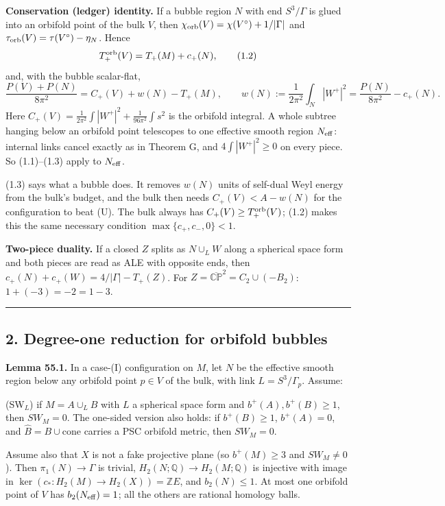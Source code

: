 \documentclass[
  10pt,
]{report}
\begin{document}
\textbf{Conservation (ledger) identity.} If a bubble region \(N\) with
end \(S^3/\Gamma\) is glued into an orbifold point of the bulk \(V\),
then \(\chi_{\rm orb}(V)=\chi(V^\circ)+1/|\Gamma|\) and
\(\tau_{\rm orb}(V)=\tau(V^\circ)-\eta_N\). Hence \[
T_+^{\rm orb}(V)=T_+(M)+c_+(N),\tag{1.2}
\] and, with the bubble scalar-flat, \[
\frac{P(V)+P(N)}{8\pi^2}=C_+(V)+w(N)-T_+(M),\qquad w(N):=\frac1{2\pi^2}\int_N|W^+|^2=\frac{P(N)}{8\pi^2}-c_+(N).\tag{1.3}
\] Here \(C_+(V)=\frac1{2\pi^2}\int|W^+|^2+\frac1{96\pi^2}\int s^2\) is
the orbifold integral. A whole subtree hanging below an orbifold point
telescopes to one effective smooth region \(N_{\rm eff}\): internal
links cancel exactly as in Theorem G, and \(4\int|W^+|^2\ge0\) on every
piece. So (1.1)--(1.3) apply to \(N_{\rm eff}\).

(1.3) says what a bubble does. It removes \(w(N)\) units of self-dual
Weyl energy from the bulk's budget, and the bulk then needs
\(C_+(V)<A-w(N)\) for the configuration to beat (U). The bulk always has
\(C_+(V)\ge T_+^{\rm orb}(V)\); (1.2) makes this the same necessary
condition \(\max\{c_+,c_-,0\}<1\).

\textbf{Two-piece duality.} If a closed \(Z\) splits as \(N\cup_LW\)
along a spherical space form and both pieces are read as ALE with
opposite ends, then \(c_+(N)+c_+(W)=4/|\Gamma|-T_+(Z)\). For
\(Z=\overline{\mathbb{CP}}^2=C_2\cup(-B_2)\): \(1+(-3)=-2=1-3\).

\begin{center}\rule{0.5\linewidth}{0.5pt}\end{center}

\hypertarget{degree-one-reduction-for-orbifold-bubbles}{%
\subsection{2. Degree-one reduction for orbifold
bubbles}\label{degree-one-reduction-for-orbifold-bubbles}}

\textbf{Lemma 55.1.} In a case-(I) configuration on \(M\), let \(N\) be
the effective smooth region below any orbifold point \(p\in V\) of the
bulk, with link \(L=S^3/\Gamma_p\). Assume:

(SW\(_L\)) if \(M=A\cup_LB\) with \(L\) a spherical space form and
\(b^+(A),b^+(B)\ge1\), then \(SW_M=0\). The one-sided version also
holds: if \(b^+(B)\ge1\), \(b^+(A)=0\), and
\(\widehat B=B\cup\mathrm{cone}\) carries a PSC orbifold metric, then
\(SW_M=0\).

Assume also that \(X\) is not a fake projective plane (so \(b^+(M)\ge3\)
and \(SW_M\ne0\)). Then \(\pi_1(N)\to\Gamma\) is trivial,
\(H_2(N;\mathbb Q)\to H_2(M;\mathbb Q)\) is injective with image in
\(\ker(c_*:H_2(M)\to H_2(X))=\mathbb ZE\), and \(b_2(N)\le1\). At most
one orbifold point of \(V\) has \(b_2(N_{\rm eff})=1\); all the others
are rational homology balls.
\end{document}
